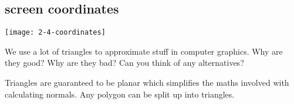 \documentclass{supervision}
\begin{document}
\begin{questions}
\begin{parts}
        \part{screen coordinates}
    \end{parts}
    \begin{solution}
    \begin{center}
        \texttt{[image: 2-4-coordinates]}
    \end{center}
    \end{solution}

    \question
    We use a lot of triangles to approximate stuff in computer graphics. Why are they good? Why are they bad? Can you think of any alternatives?
    \begin{solution}
    Triangles are guaranteed to be planar which simplifies the maths involved with calculating normals. Any polygon can be split up into triangles.
    
    \end{solution}


\end{questions}
\end{document}
